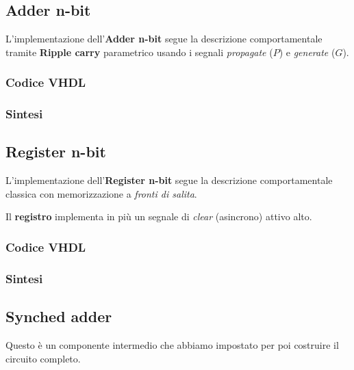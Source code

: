 \documentclass[12pt]{article}
\begin{document}
    \subsection{Adder n-bit}
        L'implementazione dell'\textbf{Adder n-bit} segue la descrizione comportamentale tramite \textbf{Ripple carry} parametrico usando i segnali \textit{propagate} ($P$) e \textit{generate} ($G$).

        \subsubsection{Codice VHDL}
            
            
        \subsubsection{Sintesi}

    \subsection{Register n-bit}
        L'implementazione dell'\textbf{Register n-bit} segue la descrizione comportamentale classica con memorizzazione a \textit{fronti di salita}.
        
        Il \textbf{registro} implementa in più un segnale di \textit{clear} (asincrono) attivo alto.

        \subsubsection{Codice VHDL}
           
            
        \subsubsection{Sintesi}

    \subsection{Synched adder}
        Questo è un componente intermedio che abbiamo impostato per poi costruire il circuito completo.
\end{document}

